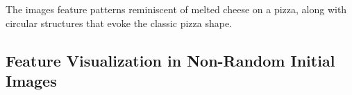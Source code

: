 The images feature patterns reminiscent of melted cheese on a pizza, along with circular structures that evoke the classic pizza shape.
\subsection{Feature Visualization in Non-Random Initial Images}

